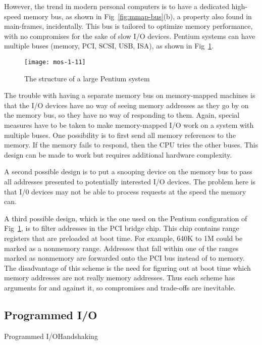 However, the trend in modern personal computers is to have a dedicated high-speed memory
bus, as shown in Fig~\ref{fig:mmap-bus}(b), a property also found in main-frames,
incidentally. This bus is tailored to optimize memory performance, with no compromises for
the sake of slow I/O devices. Pentium systems can have multiple buses (memory, PCI, SCSI,
USB, ISA), as shown in Fig~\ref{fig:pentium-buses}.

\begin{figure}[h]
  \centering
  \texttt{[image: mos-1-11]}
  \caption{The structure of a large Pentium system}
  \label{fig:pentium-buses}
\end{figure}

The trouble with having a separate memory bus on memory-mapped machines is that the I/O
devices have no way of seeing memory addresses as they go by on the memory bus, so they
have no way of responding to them. Again, special measures have to be taken to make
memory-mapped I/O work on a system with multiple buses. One possibility is to first send
all memory references to the memory. If the memory fails to respond, then the CPU tries
the other buses. This design can be made to work but requires additional hardware
complexity.

A second possible design is to put a snooping device on the memory bus to pass all
addresses presented to potentially interested I/O devices. The problem here is that I/0
devices may not be able to process requests at the speed the memory can.

A third possible design, which is the one used on the Pentium configuration of
Fig~\ref{fig:pentium-buses}, is to filter addresses in the PCI bridge chip. This chip
contains range registers that are preloaded at boot time. For example, 640K to 1M could be
marked as a nonmemory range. Addresses that fall within one of the ranges marked as
nonmemory are forwarded onto the PCI bus instead of to memory. The disadvantage of this
scheme is the need for figuring out at boot time which memory addresses are not really
memory addresses. Thus each scheme has arguments for and against it, so compromises and
trade-offs are inevitable.

\subsection{Programmed I/O}

\begin{frame}{Programmed I/O}{Handshaking}
  \begin{center}
     
  \end{center}
\end{frame}

